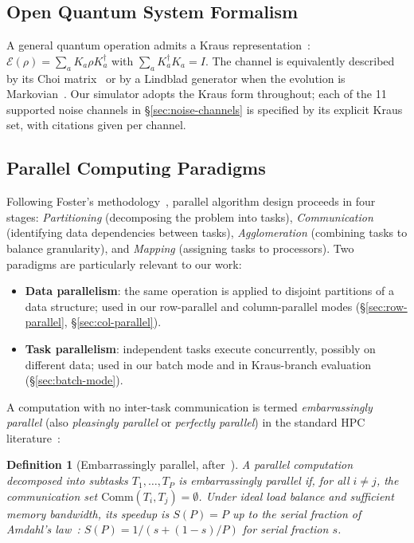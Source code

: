 \documentclass[11pt,a4paper]{article}
\newtheorem{definition}[theorem]{Definition}
\begin{document}
\subsection{Open Quantum System Formalism}
\label{sec:bg-oqs}

A general quantum operation admits a Kraus representation~\cite{kraus1983,choi1975}:
$\mathcal{E}(\rho) = \sum_a K_a \rho K_a^\dagger$ with
$\sum_a K_a^\dagger K_a = I$. The channel is equivalently described by its Choi
matrix~\cite{choi1975} or by a Lindblad generator when the evolution is
Markovian~\cite{breuerpetruccione2002,lindblad1976}. Our simulator adopts the Kraus
form throughout; each of the 11 supported noise channels in \S\ref{sec:noise-channels}
is specified by its explicit Kraus set, with citations given per channel.

\subsection{Parallel Computing Paradigms}
\label{sec:bg-parallel}

Following Foster's methodology~\cite{foster1995}, parallel algorithm design proceeds
in four stages: \emph{Partitioning} (decomposing the problem into tasks), \emph{Communication}
(identifying data dependencies between tasks), \emph{Agglomeration} (combining tasks
to balance granularity), and \emph{Mapping} (assigning tasks to processors). Two
paradigms are particularly relevant to our work:

\begin{itemize}
  \item \textbf{Data parallelism}: the same operation is applied to disjoint partitions
        of a data structure; used in our row-parallel and column-parallel modes
        (\S\ref{sec:row-parallel}, \S\ref{sec:col-parallel}).
  \item \textbf{Task parallelism}: independent tasks execute concurrently, possibly on
        different data; used in our batch mode and in Kraus-branch evaluation
        (\S\ref{sec:batch-mode}).
\end{itemize}

A computation with no inter-task communication is termed \emph{embarrassingly parallel}
(also \emph{pleasingly parallel} or \emph{perfectly parallel}) in the standard
HPC literature~\cite{foster1995,wilkinson2005}:

\begin{definition}[Embarrassingly parallel, after~\cite{foster1995}]
\label{def:ep}
A parallel computation decomposed into subtasks $T_1,\ldots,T_P$ is \emph{embarrassingly
parallel} if, for all $i \neq j$, the communication set
$\mathrm{Comm}(T_i, T_j) = \emptyset$. Under ideal load balance and sufficient memory
bandwidth, its speedup is $S(P) = P$ up to the serial fraction of Amdahl's
law~\cite{amdahl1967}: $S(P) = 1/(s + (1-s)/P)$ for serial fraction $s$.
\end{definition}
\end{document}
